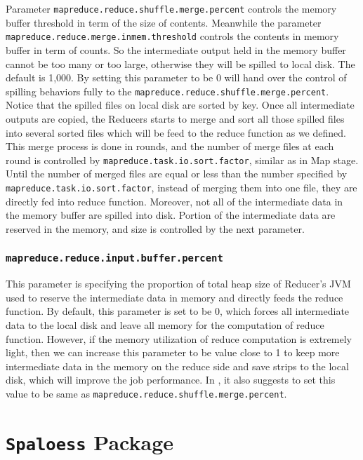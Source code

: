 Parameter \texttt{mapreduce.reduce.shuffle.merge.percent} controls the memory
buffer threshold in term of the size of contents. Meanwhile the parameter \\
\texttt{mapreduce.reduce.merge.inmem.threshold} controls the contents in memory
buffer in term of counts. So the intermediate output held in the memory buffer
cannot be too many or too large, otherwise they will be spilled to local disk.
The default is 1,000. By setting this parameter to be 0 will hand over the control
of spilling behaviors fully to the \texttt{mapreduce.reduce.shuffle.merge.percent}. 
Notice that the spilled files on local disk are sorted by key. Once all 
intermediate outputs are copied, the Reducers starts to merge and sort all those
spilled files into several sorted files which will be feed to the reduce function
as we defined. This merge process is done in rounds, and the number of merge files
at each round is controlled by \texttt{mapreduce.task.io.sort.factor}, similar 
as in Map stage. Until the number of merged files are equal or less than the number 
specified by \\ \texttt{mapreduce.task.io.sort.factor}, instead of merging them 
into one file, they are directly fed into reduce function. Moreover, not all
of the intermediate data in the memory buffer are spilled into disk. Portion of 
the intermediate data are reserved in the memory, and size is controlled by the
next parameter.

\subsubsection{\texttt{mapreduce.reduce.input.buffer.percent}}

This parameter is specifying the proportion of total heap size of Reducer's JVM
used to reserve the intermediate data in memory and directly feeds the reduce
function. By default, this parameter is set to be 0, which forces all intermediate
data to the local disk and leave all memory for the computation of reduce function.
However, if the memory utilization of reduce computation is extremely light, then
we can increase this parameter to be value close to 1 to keep more intermediate
data in the memory on the reduce side and save strips to the local disk, which
will improve the job performance. In \cite{li2014mronline}, it also suggests to
set this value to be same as \texttt{mapreduce.reduce.shuffle.merge.percent}. 


\section{\texttt{Spaloess} Package}

